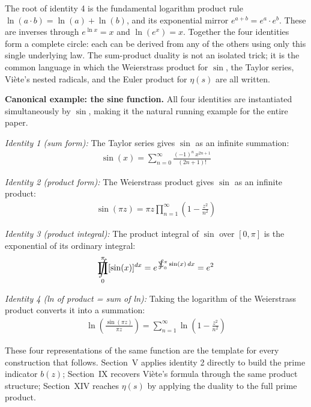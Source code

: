 \documentclass{article}
\DeclareMathOperator*{\SumInt}{%
\mathchoice%
  {\ooalign{$\displaystyle\sum$\cr\hidewidth$\displaystyle\int$\hidewidth\cr}}
  {\ooalign{\raisebox{.14\height}{\scalebox{.7}{$\textstyle\sum$}}\cr\hidewidth$\textstyle\int$\hidewidth\cr}}
  {\ooalign{\raisebox{.2\height}{\scalebox{.6}{$\scriptstyle\sum$}}\cr$\scriptstyle\int$\cr}}
  {\ooalign{\raisebox{.2\height}{\scalebox{.6}{$\scriptstyle\sum$}}\cr$\scriptstyle\int$\cr}}
}
\DeclareMathOperator*{\ProdInt}{%
\mathchoice%
  {\ooalign{$\displaystyle\prod$\cr\hidewidth$\displaystyle\int$\hidewidth\cr}}
  {\ooalign{\raisebox{.14\height}{\scalebox{.7}{$\textstyle\prod$}}\cr\hidewidth$\textstyle\int$\hidewidth\cr}}
  {\ooalign{\raisebox{.2\height}{\scalebox{.6}{$\scriptstyle\prod$}}\cr$\scriptstyle\int$\cr}}
  {\ooalign{\raisebox{.2\height}{\scalebox{.6}{$\scriptstyle\prod$}}\cr$\scriptstyle\int$\cr}}
}
\begin{document}
The root of identity 4 is the fundamental logarithm product rule $\ln(a \cdot b) = \ln(a) + \ln(b)$, and its exponential mirror $e^{a+b} = e^a \cdot e^b$. These are inverses through $e^{\ln x} = x$ and $\ln(e^x) = x$. Together the four identities form a complete circle: each can be derived from any of the others using only this single underlying law. The sum-product duality is not an isolated trick; it is the common language in which the Weierstrass product for $\sin$, the Taylor series, Viète's nested radicals, and the Euler product for $\eta(s)$ are all written.

\newpage
\textbf{Canonical example: the sine function.} All four identities are instantiated simultaneously by $\sin$, making it the natural running example for the entire paper.

\textit{Identity 1 (sum form):} The Taylor series gives $\sin$ as an infinite summation:
\begin{align*}
\sin(x) = \sum_{n=0}^{\infty} \frac{(-1)^n\, x^{2n+1}}{(2n+1)!}
\end{align*}

\textit{Identity 2 (product form):} The Weierstrass product gives $\sin$ as an infinite product:
\begin{align*}
\sin(\pi z) = \pi z \prod_{n=1}^{\infty}\left(1 - \frac{z^2}{n^2}\right)
\end{align*}

\textit{Identity 3 (product integral):} The product integral of $\sin$ over $[0, \pi]$ is the exponential of its ordinary integral:
\begin{align*}
\ProdInt_{0}^{\pi} [\sin(x)]^{dx} = e^{\,\SumInt_{0}^{\pi} \sin(x)\,dx} = e^{2}
\end{align*}

\textit{Identity 4 (ln of product = sum of ln):} Taking the logarithm of the Weierstrass product converts it into a summation:
\begin{align*}
\ln\!\left(\frac{\sin(\pi z)}{\pi z}\right) = \sum_{n=1}^{\infty} \ln\!\left(1 - \frac{z^2}{n^2}\right)
\end{align*}

These four representations of the same function are the template for every construction that follows. Section~V applies identity 2 directly to build the prime indicator $b(z)$; Section~IX recovers Viète's formula through the same product structure; Section~XIV reaches $\eta(s)$ by applying the duality to the full prime product.
\end{document}
